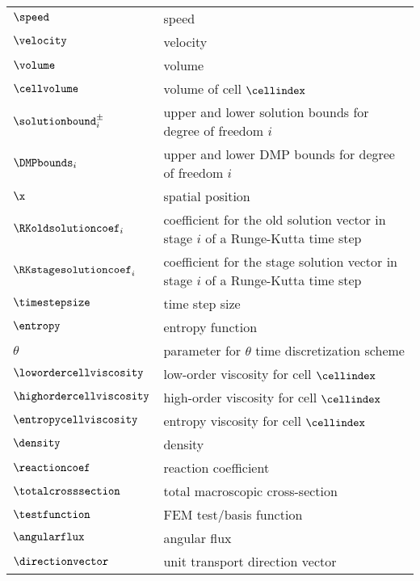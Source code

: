 \begin{center}
\begin{longtable}{l p{4.8in}}
$\speed$           & speed\\
$\velocity$        & velocity\\
$\volume$          & volume\\
$\cellvolume$      & volume of cell $\cellindex$\\
$\solutionbound_i^\pm$ & upper and lower solution bounds for degree of freedom $i$\\
$\DMPbounds_i$     & upper and lower DMP bounds for degree of freedom $i$\\
$\x$               & spatial position\\
$\RKoldsolutioncoef_i$ & coefficient for the old solution vector in stage
                         $i$ of a Runge-Kutta time step\\
$\RKstagesolutioncoef_i$ & coefficient for the stage solution vector in stage
                           $i$ of a Runge-Kutta time step\\
$\timestepsize$    & time step size\\
$\entropy$         & entropy function\\
$\theta$           & parameter for $\theta$ time discretization scheme\\

$\lowordercellviscosity$  & low-order viscosity for cell $\cellindex$\\
$\highordercellviscosity$ & high-order viscosity for cell $\cellindex$\\
$\entropycellviscosity$   & entropy viscosity for cell $\cellindex$\\
$\density$         & density\\
$\reactioncoef$    & reaction coefficient\\
$\totalcrosssection$ & total macroscopic cross-section\\
$\testfunction$    & FEM test/basis function\\
$\angularflux$     & angular flux\\
$\directionvector$ & unit transport direction vector\\
\end{longtable}
\end{center}

\pagebreak{}
